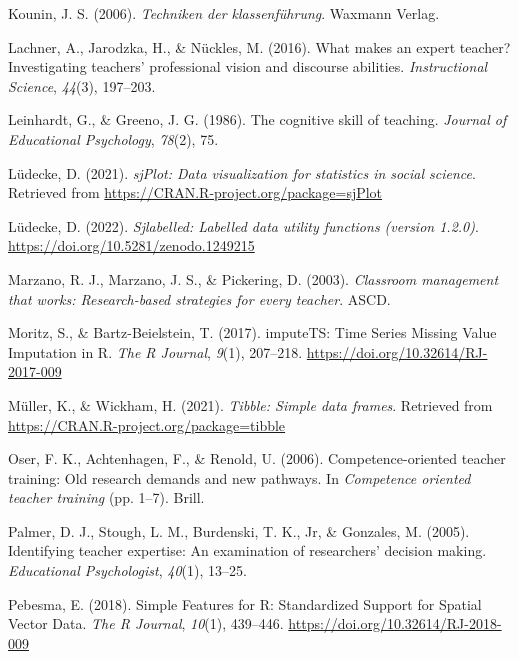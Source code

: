 \documentclass[
  man]{apa6}
\newlength{\cslhangindent}
\newenvironment{CSLReferences}[2] %
 {\begin{list}{}{%
  \setlength{\itemindent}{0pt}
  \setlength{\leftmargin}{0pt}
  \setlength{\parsep}{0pt}
  \ifodd #1
   \setlength{\leftmargin}{\cslhangindent}
   \setlength{\itemindent}{-1\cslhangindent}
  \fi
  \setlength{\itemsep}{#2\baselineskip}}}
 {\end{list}}
\begin{document}
\begin{CSLReferences}{1}{0}
Kounin, J. S. (2006). \emph{Techniken der klassenf{ü}hrung}. Waxmann Verlag.

Lachner, A., Jarodzka, H., \& Nückles, M. (2016). What makes an expert teacher? Investigating teachers' professional vision and discourse abilities. \emph{Instructional Science}, \emph{44}(3), 197--203.

Leinhardt, G., \& Greeno, J. G. (1986). The cognitive skill of teaching. \emph{Journal of Educational Psychology}, \emph{78}(2), 75.

Lüdecke, D. (2021). \emph{sjPlot: Data visualization for statistics in social science}. Retrieved from \url{https://CRAN.R-project.org/package=sjPlot}

Lüdecke, D. (2022). \emph{Sjlabelled: Labelled data utility functions (version 1.2.0)}. \url{https://doi.org/10.5281/zenodo.1249215}

Marzano, R. J., Marzano, J. S., \& Pickering, D. (2003). \emph{Classroom management that works: Research-based strategies for every teacher}. ASCD.

Moritz, S., \& Bartz-Beielstein, T. (2017). {imputeTS: Time Series Missing Value Imputation in R}. \emph{{The R Journal}}, \emph{9}(1), 207--218. \url{https://doi.org/10.32614/RJ-2017-009}

Müller, K., \& Wickham, H. (2021). \emph{Tibble: Simple data frames}. Retrieved from \url{https://CRAN.R-project.org/package=tibble}

Oser, F. K., Achtenhagen, F., \& Renold, U. (2006). Competence-oriented teacher training: Old research demands and new pathways. In \emph{Competence oriented teacher training} (pp. 1--7). Brill.

Palmer, D. J., Stough, L. M., Burdenski, T. K., Jr, \& Gonzales, M. (2005). Identifying teacher expertise: An examination of researchers' decision making. \emph{Educational Psychologist}, \emph{40}(1), 13--25.

Pebesma, E. (2018). {Simple Features for R: Standardized Support for Spatial Vector Data}. \emph{{The R Journal}}, \emph{10}(1), 439--446. \url{https://doi.org/10.32614/RJ-2018-009}


\end{CSLReferences}
\end{document}
